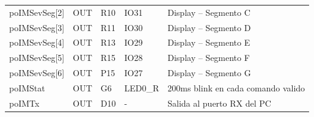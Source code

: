 \documentclass[12pt]{article}
\begin{document}
{\begin{tabular}{|p{2.5cm}|p{2.5cm}|p{1.3cm}|p{1.8cm}|p{7.5cm}|}
poIMSevSeg[2] &
OUT &
R10 &
IO31 &
Display – Segmento C
\\

poIMSevSeg[3] &
OUT &
R11 &
IO30 &
Display – Segmento D
\\

poIMSevSeg[4] &
OUT &
R13 &
IO29 &
Display – Segmento E
\\

poIMSevSeg[5] &
OUT &
R15 &
IO28 &
Display – Segmento F
\\

poIMSevSeg[6] &
OUT &
P15 &
IO27 &
Display – Segmento G
\\

poIMStat &
OUT &
G6 &
LED0\_R &
200ms blink en cada comando valido
\\

poIMTx &
OUT &
D10 &
- &
Salida al puerto RX del PC
\\

\hline
\end{tabular}}
\end{document}

